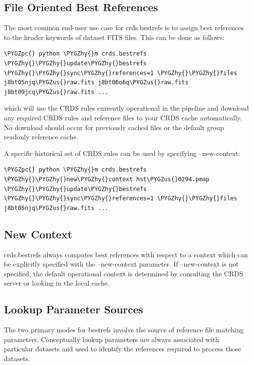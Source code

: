 \documentclass[letterpaper,10pt,english]{sphinxmanual}
\def\PYGZus{\char`\_}
\def\PYGZpc{\char`\%}
\def\PYGZhy{\char`\-}
\begin{document}
\subsection{File Oriented Best References}
\label{command_line_tools:file-oriented-best-references}
The most common end-user use case for crds.bestrefs is to assign best references to the header keywords of
dataset FITS files.   This can be done as follows:

\begin{Verbatim}[commandchars=\\\{\}]
\PYGZpc{} python \PYGZhy{}m crds.bestrefs \PYGZhy{}\PYGZhy{}update\PYGZhy{}bestrefs \PYGZhy{}\PYGZhy{}sync\PYGZhy{}references=1 \PYGZhy{}\PYGZhy{}files j8bt05njq\PYGZus{}raw.fits j8bt06o6q\PYGZus{}raw.fits j8bt09jcq\PYGZus{}raw.fits ...
\end{Verbatim}

which will use the CRDS rules currently operational in the pipeline and download any required CRDS rules and reference files
to your CRDS cache automatically.   No download should occur for previously cached files or the default group readonly reference
cache.

A specific historical set of CRDS rules can be used by specifying --new-context:

\begin{Verbatim}[commandchars=\\\{\}]
\PYGZpc{} python \PYGZhy{}m crds.bestrefs \PYGZhy{}\PYGZhy{}new\PYGZhy{}context hst\PYGZus{}0294.pmap \PYGZhy{}\PYGZhy{}update\PYGZhy{}bestrefs \PYGZhy{}\PYGZhy{}sync\PYGZhy{}references=1 \PYGZhy{}\PYGZhy{}files j8bt05njq\PYGZus{}raw.fits ...
\end{Verbatim}


\subsection{New Context}
\label{command_line_tools:new-context}
crds.bestrefs always computes best references with respect to a context which can be explicitly specified with the
--new-context parameter.    If --new-context is not specified,  the default operational context is determined by
consulting the CRDS server or looking in the local cache.


\subsection{Lookup Parameter Sources}
\label{command_line_tools:lookup-parameter-sources}
The two primary modes for bestrefs involve the source of reference file matching parameters.   Conceptually
lookup parameters are always associated with particular datasets and used to identify the references
required to process those datasets.
\end{document}
